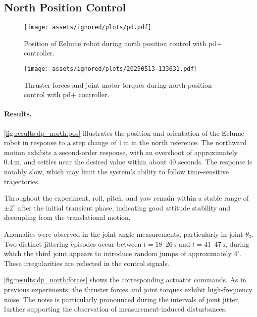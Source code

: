 \FloatBarrier


\subsection{North Position Control}

\begin{figure}[!ht]
    \centering
    \texttt{[image: assets/ignored/plots/pd.pdf]}
    \caption{Position of Eelume robot during north position control with \gls{pd+} controller.}
    \label{fig:results:dp_north:pos}
\end{figure}

\begin{figure}[!ht]
    \centering
    \texttt{[image: assets/ignored/plots/20250513-133631.pdf]}
    \caption{Thruster forces and joint motor torques during north position control with \gls{pd+} controller.}
    \label{fig:results:dp_north:forces}
\end{figure}

\paragraph{Results.}

\autoref{fig:results:dp_north:pos} illustrates the position and orientation of the Eelume robot in response to a step change of \(1\,\mathrm{m}\) in the north reference. The northward motion exhibits a second-order response, with an overshoot of approximately \(0.4\,\mathrm{m}\), and settles near the desired value within about \(40\) seconds. The response is notably slow, which may limit the system's ability to follow time-sensitive trajectories.

Throughout the experiment, roll, pitch, and yaw remain within a stable range of \(\pm 2^\circ\) after the initial transient phase, indicating good attitude stability and decoupling from the translational motion.

Anomalies were observed in the joint angle measurements, particularly in joint \(\theta_3\). Two distinct jittering episodes occur between \(t = 18\text{–}26\,\mathrm{s}\) and \(t = 41\text{–}47\,\mathrm{s}\), during which the third joint appears to introduce random jumps of approximately \(4^\circ\). These irregularities are reflected in the control signals.

\autoref{fig:results:dp_north:forces} shows the corresponding actuator commands. As in previous experiments, the thruster forces and joint torques exhibit high-frequency noise. The noise is particularly pronounced during the intervals of joint jitter, further supporting the observation of measurement-induced disturbances.

